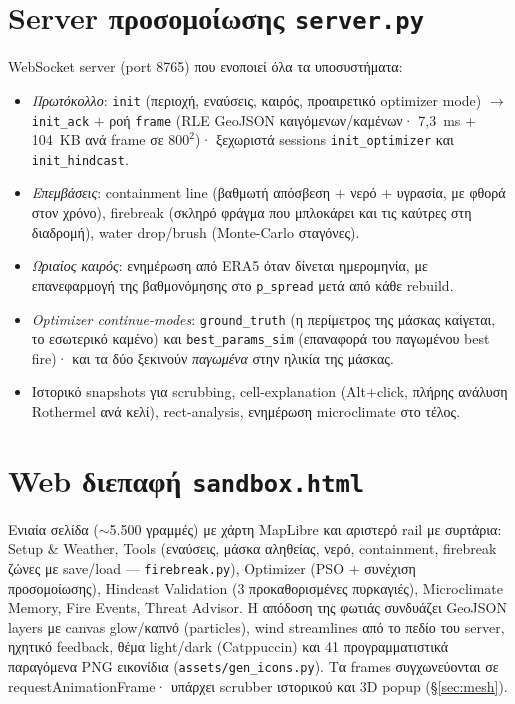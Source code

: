 \documentclass[11pt]{article}
\newcommand{\code}[1]{\texttt{#1}}
\begin{document}
\section{Server προσομοίωσης \code{server.py}}

WebSocket server (port 8765) που ενοποιεί όλα τα υποσυστήματα:
\begin{itemize}
  \item \emph{Πρωτόκολλο}: \code{init} (περιοχή, εναύσεις, καιρός,
        προαιρετικό optimizer mode) $\to$ \code{init\_ack} $+$ ροή
        \code{frame} (RLE GeoJSON καιγόμενων/καμένων· 7{,}3~ms $+$ 104~KB
        ανά frame σε $800^2$)· ξεχωριστά sessions \code{init\_optimizer}
        και \code{init\_hindcast}.
  \item \emph{Επεμβάσεις}: containment line (βαθμωτή απόσβεση $+$ νερό $+$
        υγρασία, με φθορά στον χρόνο), firebreak (σκληρό φράγμα που
        μπλοκάρει και τις καύτρες στη διαδρομή), water drop/brush
        (Monte-Carlo σταγόνες).
  \item \emph{Ωριαίος καιρός}: ενημέρωση από ERA5 όταν δίνεται ημερομηνία,
        με επανεφαρμογή της βαθμονόμησης στο \code{p\_spread} μετά από
        κάθε rebuild.
  \item \emph{Optimizer continue-modes}: \code{ground\_truth} (η
        περίμετρος της μάσκας καίγεται, το εσωτερικό καμένο) και
        \code{best\_params\_sim} (επαναφορά του παγωμένου best fire)· και
        τα δύο ξεκινούν \emph{παγωμένα} στην ηλικία της μάσκας.
  \item Ιστορικό snapshots για scrubbing, cell-explanation
        (Alt$+$click, πλήρης ανάλυση Rothermel ανά κελί), rect-analysis,
        ενημέρωση microclimate στο τέλος.
\end{itemize}

\section{Web διεπαφή \code{sandbox.html}}

Ενιαία σελίδα ($\sim$5.500 γραμμές) με χάρτη MapLibre και αριστερό rail
με συρτάρια: Setup \& Weather, Tools (εναύσεις, μάσκα αληθείας, νερό,
containment, firebreak ζώνες με save/load --- \code{firebreak.py}),
Optimizer (PSO $+$ συνέχιση προσομοίωσης), Hindcast Validation (3
προκαθορισμένες πυρκαγιές), Microclimate Memory, Fire Events, Threat
Advisor. Η απόδοση της φωτιάς συνδυάζει GeoJSON layers με canvas
glow/καπνό (particles), wind streamlines από το πεδίο του server, ηχητικό
feedback, θέμα light/dark (Catppuccin) και 41 προγραμματιστικά παραγόμενα
PNG εικονίδια (\code{assets/gen\_icons.py}). Τα frames συγχωνεύονται σε
requestAnimationFrame· υπάρχει scrubber ιστορικού και 3D popup
(\S\ref{sec:mesh}).
\end{document}
